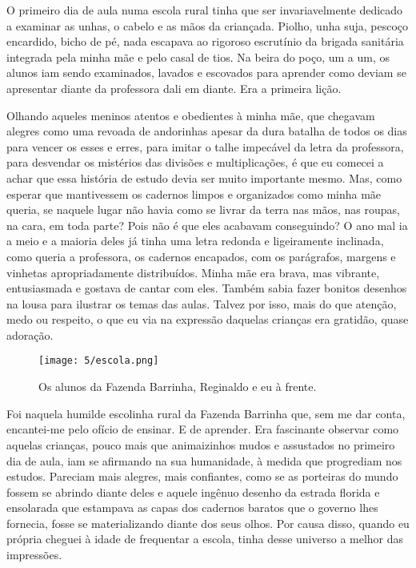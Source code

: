O primeiro dia de aula numa escola rural tinha que ser invariavelmente dedicado a examinar as unhas, o cabelo e as mãos da criançada.
Piolho, unha suja, pescoço encardido, bicho de pé, nada escapava ao rigoroso escrutínio da brigada sanitária integrada pela minha mãe e pelo casal de tios. 
Na beira do poço, um a um, os alunos iam sendo examinados, lavados e escovados para aprender como deviam se apresentar diante da professora dali em diante. 
Era a primeira lição.

Olhando aqueles meninos atentos e obedientes à minha mãe, que chegavam alegres como uma revoada de andorinhas apesar da dura batalha de todos os dias para vencer os esses e erres, para imitar o talhe impecável da letra da professora, para desvendar os mistérios das divisões e multiplicações, é que eu comecei a achar que essa história de estudo devia ser muito importante mesmo. 
Mas, como esperar que mantivessem os cadernos limpos e organizados como minha mãe queria, se naquele lugar não havia como se livrar da terra nas mãos, nas roupas, na cara, em toda parte? 
Pois não é que eles acabavam conseguindo?  
O ano mal ia a meio e a maioria deles já tinha uma letra redonda e ligeiramente inclinada, como queria a professora, os cadernos encapados, com os parágrafos, margens e vinhetas apropriadamente distribuídos. 
Minha mãe era brava, mas vibrante, entusiasmada e gostava de cantar com eles. 
Também sabia fazer bonitos desenhos na lousa para ilustrar os temas das aulas. Talvez por isso, mais do que atenção, medo ou respeito, o que eu via na expressão daquelas crianças era gratidão, quase adoração.

\begin{figure}[H]
\centering
\texttt{[image: 5/escola.png]}
\caption{Os alunos da Fazenda Barrinha, Reginaldo e eu à frente.}
\end{figure}

Foi naquela humilde escolinha rural da Fazenda Barrinha que, sem me dar conta, encantei-me pelo ofício de ensinar.  
E de aprender. 
Era fascinante observar como aquelas crianças, pouco mais que animaizinhos mudos e assustados no primeiro dia de aula, iam se afirmando na sua humanidade, à medida que progrediam nos estudos. 
Pareciam mais alegres, mais confiantes, como se as porteiras do mundo fossem se abrindo diante deles e aquele ingênuo desenho da estrada florida e ensolarada que estampava as capas dos cadernos baratos que o governo lhes fornecia, fosse se materializando diante dos seus olhos.  
Por causa disso, quando eu própria cheguei à idade de frequentar a escola, tinha desse universo a melhor das impressões.
    
